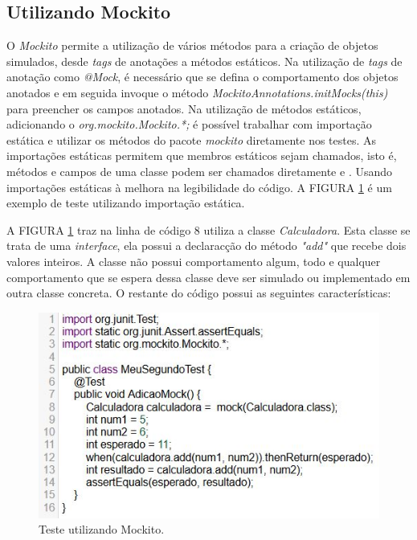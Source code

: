 \subsection{Utilizando Mockito}

O \textit{Mockito} permite a utilização de vários métodos para a criação de objetos simulados, desde \textit{tags} de anotações a métodos estáticos. 
Na utilização de \textit{tags} de anotação como \textit{@Mock}, é necessário que se defina o comportamento dos objetos anotados e em seguida invoque o método \textit{MockitoAnnotations.initMocks(this)} para preencher os campos anotados.
Na utilização de métodos estáticos, adicionando o \textit{org.mockito.Mockito.*;} é possível trabalhar com importação estática e utilizar os métodos do pacote \textit{mockito} diretamente nos testes. As importações estáticas permitem que membros estáticos sejam chamados, isto é, métodos e campos de uma classe podem ser chamados diretamente \cite{Mockito} e \cite{Javadoc}.
Usando importações estáticas à melhora na legibilidade do código. A FIGURA \ref{mockito} é um exemplo de teste utilizando importação estática.




A FIGURA \ref{mockito} traz na linha de código 8 utiliza a classe \textit{Calculadora}. Esta classe se trata de uma \textit{interface}, ela possui a declaracção do método \textit{"add"} que recebe dois valores inteiros. A classe não possui comportamento algum, todo e qualquer comportamento que se espera dessa classe deve ser simulado ou implementado em outra classe concreta. O restante do código possui as seguintes características:

\begin{figure}[H]
	\centering
	\includegraphics[scale=0.9]{dados/figuras/testeMock.JPG}
	\caption{Teste utilizando Mockito.}
	\label{mockito}
\end{figure}


